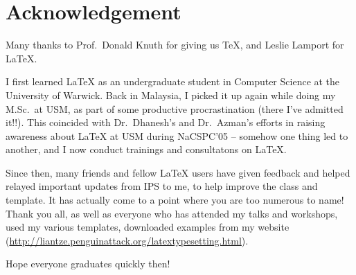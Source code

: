 \chapter{Acknowledgement}

Many thanks to Prof.~Donald Knuth for giving us \TeX, and Leslie Lamport for \LaTeX.  

I first learned \LaTeX{} as an undergraduate student in Computer Science at the University of Warwick. Back in Malaysia, I picked it up again while doing my M.Sc.~at USM, as part of some productive procrastination (there I've admitted it!!). This coincided with Dr.~Dhanesh's and Dr.~Azman's efforts in raising awareness about \LaTeX{} at USM during NaCSPC'05 -- somehow one thing led to another, and I now conduct trainings and consultatons on \LaTeX. \Smiley

Since then, many friends and fellow \LaTeX{} users have given feedback and helped relayed important updates from IPS to me, to help improve the class and template. It has actually come to a point where you are too numerous to name! Thank you all, as well as everyone who has attended my talks and workshops, used my various templates, downloaded examples from my website (\url{http://liantze.penguinattack.org/latextypesetting.html}).

Hope everyone graduates quickly then!



